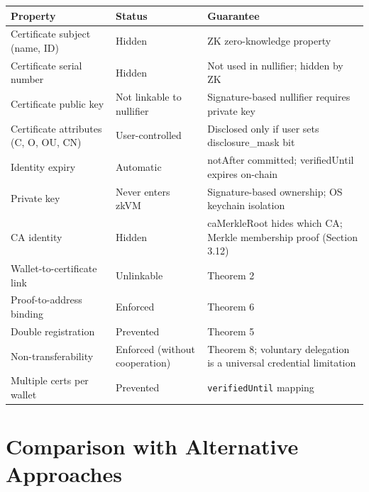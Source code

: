\documentclass[11pt, a4paper]{article}
\begin{document}
\begin{longtable}[]{@{}
  >{\raggedright\arraybackslash}p{}
  >{\raggedright\arraybackslash}p{}
  >{\raggedright\arraybackslash}p{}@{}}
\toprule\noalign{}
\begin{minipage}[b]{\linewidth}\raggedright
Property
\end{minipage} & \begin{minipage}[b]{\linewidth}\raggedright
Status
\end{minipage} & \begin{minipage}[b]{\linewidth}\raggedright
Guarantee
\end{minipage} \\
\midrule\noalign{}
\endhead
\bottomrule\noalign{}
\endlastfoot
Certificate subject (name, ID) & Hidden & ZK zero-knowledge property \\
Certificate serial number & Hidden & Not used in nullifier; hidden by
ZK \\
Certificate public key & Not linkable to nullifier & Signature-based
nullifier requires private key \\
Certificate attributes (C, O, OU, CN) & User-controlled & Disclosed only
if user sets disclosure\_mask bit \\
Identity expiry & Automatic & notAfter committed; verifiedUntil expires
on-chain \\
Private key & Never enters zkVM & Signature-based ownership; OS keychain
isolation \\
CA identity & Hidden & caMerkleRoot hides which CA; Merkle membership
proof (Section 3.12) \\
Wallet-to-certificate link & Unlinkable & Theorem 2 \\
Proof-to-address binding & Enforced & Theorem 6 \\
Double registration & Prevented & Theorem 5 \\
Non-transferability & Enforced (without cooperation) & Theorem 8;
voluntary delegation is a universal credential limitation \\
Multiple certs per wallet & Prevented & \texttt{verifiedUntil}
mapping \\
\end{longtable}


\section{Comparison with Alternative
Approaches}\label{comparison-with-alternative-approaches}
\end{document}
